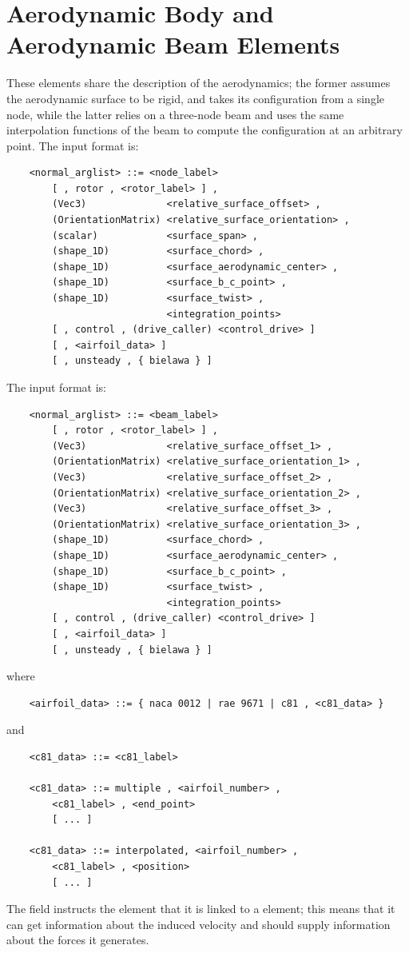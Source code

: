\section{Aerodynamic Body and Aerodynamic Beam Elements}
These elements share the description of the aerodynamics; the former assumes
the aerodynamic surface to be rigid, and takes its configuration from a
single node, while the latter relies on a three-node beam and uses the
same interpolation functions of the beam to compute the configuration 
at an arbitrary point.
The  input format is:
\begin{verbatim}
    <normal_arglist> ::= <node_label> 
        [ , rotor , <rotor_label> ] ,
        (Vec3)              <relative_surface_offset> , 
        (OrientationMatrix) <relative_surface_orientation> ,
        (scalar)            <surface_span> ,
        (shape_1D)          <surface_chord> ,
        (shape_1D)          <surface_aerodynamic_center> ,
        (shape_1D)          <surface_b_c_point> ,
        (shape_1D)          <surface_twist> ,
                            <integration_points>
        [ , control , (drive_caller) <control_drive> ] 
        [ , <airfoil_data> ]
        [ , unsteady , { bielawa } ]
\end{verbatim}
The  input format is:
\begin{verbatim}
    <normal_arglist> ::= <beam_label> 
        [ , rotor , <rotor_label> ] ,
        (Vec3)              <relative_surface_offset_1> ,       
        (OrientationMatrix) <relative_surface_orientation_1> ,
        (Vec3)              <relative_surface_offset_2> ,
        (OrientationMatrix) <relative_surface_orientation_2> ,
        (Vec3)              <relative_surface_offset_3> ,       
        (OrientationMatrix) <relative_surface_orientation_3> ,
        (shape_1D)          <surface_chord> ,
        (shape_1D)          <surface_aerodynamic_center> ,
        (shape_1D)          <surface_b_c_point> ,
        (shape_1D)          <surface_twist> ,
                            <integration_points>
        [ , control , (drive_caller) <control_drive> ] 
        [ , <airfoil_data> ]
        [ , unsteady , { bielawa } ]
\end{verbatim}
where
\begin{verbatim}
    <airfoil_data> ::= { naca 0012 | rae 9671 | c81 , <c81_data> }
\end{verbatim}
and
\begin{verbatim}
    <c81_data> ::= <c81_label> 

    <c81_data> ::= multiple , <airfoil_number> ,
        <c81_label> , <end_point>
        [ ... ]

    <c81_data> ::= interpolated, <airfoil_number> ,
        <c81_label> , <position>
        [ ... ]
\end{verbatim}
The field  instructs the element that it is linked to a 
 element; this means that it can get information about the
induced velocity and should supply information about the forces it generates.

